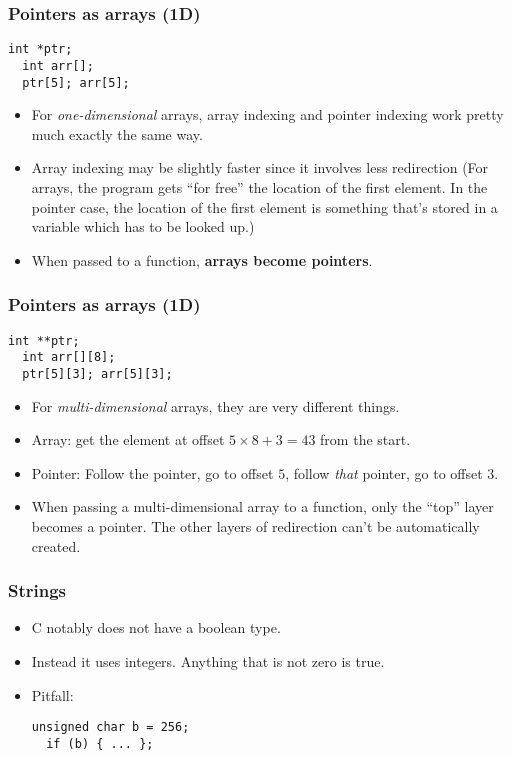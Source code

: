 \begin{frame}[fragile]
  \frametitle{Pointers as arrays (1D)}
\begin{lstlisting}[style=c]
  int *ptr;
  int arr[];
  ptr[5]; arr[5];
\end{lstlisting}
  \begin{itemize}
  \item For \emph{one-dimensional} arrays, array indexing and pointer indexing
    work pretty much exactly the same way.
  \item Array indexing may be slightly faster since it involves less redirection
    (For arrays, the program gets ``for free'' the location of the first
    element. In the pointer case, the location of the first element is something
    that's stored in a variable which has to be looked up.)
  \item When passed to a function, \textbf{arrays become pointers}.
  \end{itemize}
\end{frame}

\begin{frame}[fragile]
  \frametitle{Pointers as arrays (1D)}
\begin{lstlisting}[style=c]
  int **ptr;
  int arr[][8];
  ptr[5][3]; arr[5][3];
\end{lstlisting}
  \begin{itemize}
  \item For \emph{multi-dimensional} arrays, they are very different things.
  \item Array: get the element at offset $5\times8 + 3 = 43$ from the start.
  \item Pointer: Follow the pointer, go to offset $5$, follow \emph{that}
    pointer, go to offset $3$.
  \item When passing a multi-dimensional array to a function, only the ``top''
    layer becomes a pointer. The other layers of redirection can't be
    automatically created.
  \end{itemize}
\end{frame}

\begin{frame}[fragile]
  \frametitle{Strings}
  \begin{itemize}
  \item C notably does not have a boolean type.
  \item Instead it uses integers. Anything that is not zero is true.
  \item Pitfall:
\begin{lstlisting}[style=c]
  unsigned char b = 256;
  if (b) { ... };
\end{lstlisting}
  \end{itemize}
\end{frame}

